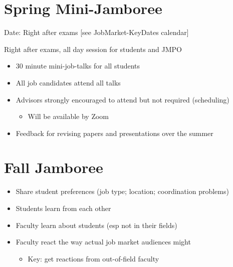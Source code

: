 \documentclass{scrartcl}
\begin{document}
\medskip


\hypertarget{jamboree-mini-spring}{}
\section*{Spring Mini-Jamboree}

Date: Right after exams [see JobMarket-KeyDates calendar]

Right after exams, all day session for students and JMPO
\begin{itemize}
  
\item 30 minute mini-job-talks for all students
\item All job candidates attend all talks
\item Advisors strongly encouraged to attend but not required (scheduling)
  \begin{itemize}
  \item Will be available by Zoom
  \end{itemize}
\item Feedback for revising papers and presentations over the summer
\end{itemize}

\hypertarget{jamboree-maxi-fall}{}
\section*{Fall Jamboree}

\begin{itemize}
\item Share student preferences (job type; location; coordination problems)
\item Students learn from each other
\item Faculty learn about students (esp not in their fields)
\item Faculty react the way actual job market audiences might
  \begin{itemize}
  \item Key: get reactions from out-of-field faculty
  \end{itemize}
\end{itemize}
\end{document}
